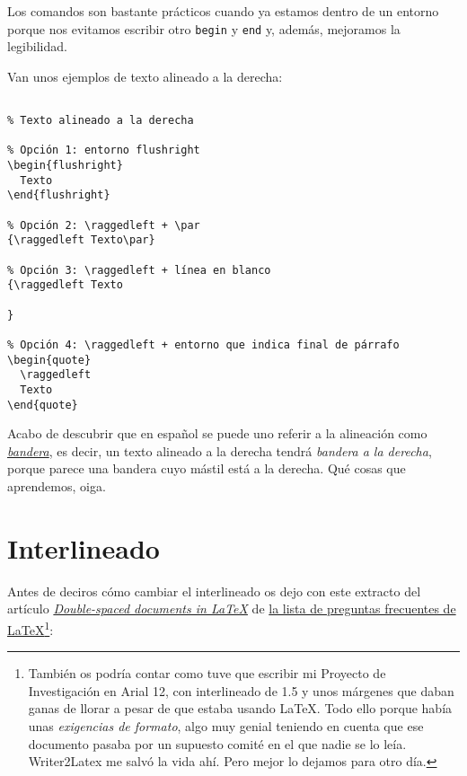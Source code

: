 Los comandos son bastante prácticos cuando ya estamos dentro de un
entorno porque nos evitamos escribir otro \lstinline!begin! y
\lstinline!end! y, además, mejoramos la legibilidad.

Van unos ejemplos de texto alineado a la derecha:

\begin{lstlisting}[language={[latex]tex}]

% Texto alineado a la derecha

% Opción 1: entorno flushright
\begin{flushright}
  Texto
\end{flushright}

% Opción 2: \raggedleft + \par
{\raggedleft Texto\par}

% Opción 3: \raggedleft + línea en blanco
{\raggedleft Texto

}

% Opción 4: \raggedleft + entorno que indica final de párrafo
\begin{quote}
  \raggedleft
  Texto
\end{quote}
\end{lstlisting}

Acabo de descubrir que en español se puede uno referir a la alineación
como \href{http://glosariografico.com/bandera}{\emph{bandera}}, es
decir, un texto alineado a la derecha tendrá \emph{bandera a la
derecha}, porque parece una bandera cuyo mástil está a la derecha. Qué
cosas que aprendemos, oiga.

\section{Interlineado}\label{sec:interlineado}

Antes de deciros cómo cambiar el interlineado os dejo con este extracto
del artículo
\href{http://www.tex.ac.uk/FAQ-linespace.html}{\emph{Double-spaced
documents in LaTeX}} de \href{http://www.tex.ac.uk/index.html}{la lista
de preguntas frecuentes de LaTeX\footnote{También os podría contar como
  tuve que escribir mi Proyecto de Investigación en Arial 12, con
  interlineado de 1.5 y unos márgenes que daban ganas de llorar a pesar
  de que estaba usando LaTeX. Todo ello porque había unas
  \emph{exigencias de formato}, algo muy genial teniendo en cuenta que
  ese documento pasaba por un supuesto comité en el que nadie se lo
  leía. \href{http://writer2latex.sourceforge.net/}{Writer2Latex} me
  salvó la vida ahí. Pero mejor lo dejamos para otro día.}}:


